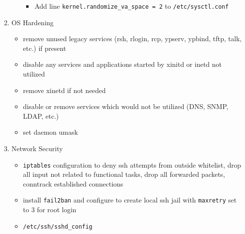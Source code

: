 \documentclass[12pt, letterpaper,oneocolumn]{article}
\begin{document}
\begin{appendices}
\begin{enumerate}
\begin{itemize}
    \begin{itemize}
    \item
      Add line \texttt{kernel.randomize\_va\_space\ =\ 2} to
      \texttt{/etc/sysctl.conf}
    \end{itemize}
  \end{itemize}
\item
  OS Hardening

  \begin{itemize}
  \item
    remove unused legacy services (rsh, rlogin, rcp, ypserv, ypbind,
    tftp, talk, etc.) if present
  \item
    disable any services and applications started by xinitd or inetd not
    utilized
  \item
    remove xinetd if not needed
  \item
    disable or remove services which would not be utilized (DNS, SNMP,
    LDAP, etc.)
  \item
    set daemon umask
  \end{itemize}
\item
  Network Security

  \begin{itemize}
  \item
    \texttt{iptables} configuration to deny ssh attempts from outside
    whitelist, drop all input not related to functional tasks, drop all
    forwarded packets, conntrack established connections
  \item
    install \texttt{fail2ban} and configure to create local ssh jail
    with \texttt{maxretry} set to 3 for root login
  \item
    \texttt{/etc/ssh/sshd\_config}


\end{itemize}
\end{enumerate}
\end{appendices}
\end{document}
